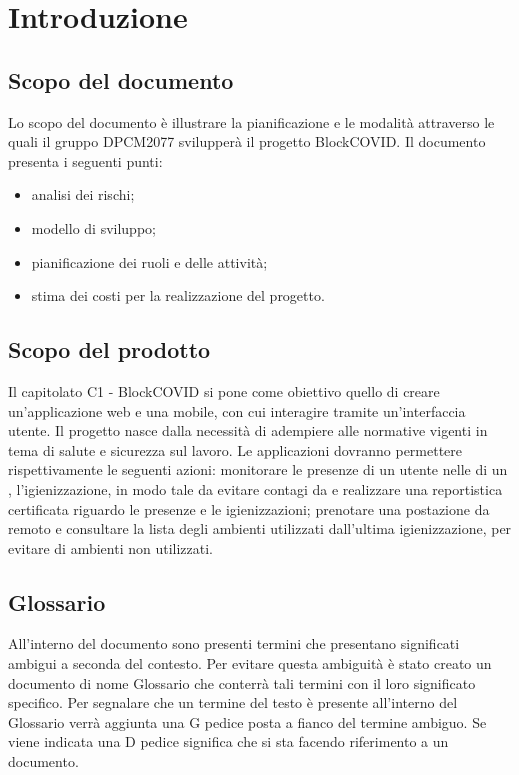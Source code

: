 \section{Introduzione}

\subsection{Scopo del documento}
Lo scopo del documento è illustrare la pianificazione e le modalità attraverso le quali il gruppo DPCM2077 svilupperà il progetto BlockCOVID.
Il documento presenta i seguenti punti:
\begin{itemize}
	\item analisi dei rischi;
	\item modello di sviluppo;
	\item pianificazione dei ruoli e delle attività;
	\item stima dei costi per la realizzazione del progetto.
\end{itemize}

\subsection{Scopo del prodotto}
Il capitolato C1 - BlockCOVID si pone come obiettivo quello di creare un'applicazione web e una mobile,
con cui interagire tramite un’interfaccia utente.
Il progetto nasce dalla necessità di adempiere alle normative vigenti in tema di salute e sicurezza sul lavoro.
Le applicazioni dovranno permettere rispettivamente le seguenti azioni: monitorare le presenze di un utente nelle  di un ,
 l'igienizzazione, in modo tale da evitare contagi da  e realizzare una reportistica certificata riguardo 
le presenze e le igienizzazioni; prenotare una postazione da remoto e consultare la lista degli ambienti utilizzati 
dall'ultima igienizzazione, per evitare di  ambienti non utilizzati.

\subsection{Glossario}
All'interno del  documento sono presenti termini che presentano significati ambigui a seconda del contesto.
Per evitare questa ambiguità è stato creato un  documento di nome Glossario che  conterrà tali termini con il loro significato specifico. Per segnalare che un termine del testo è presente all'interno del Glossario  
verrà aggiunta una G pedice posta a fianco del termine ambiguo. 
Se viene indicata una D pedice significa che si sta facendo riferimento a un documento.

